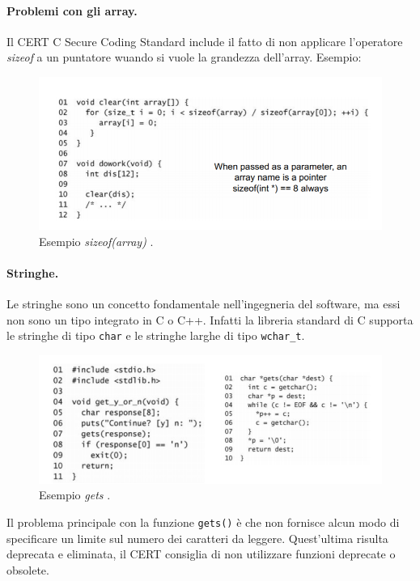 \paragraph{Problemi con gli array.}Il  CERT C Secure Coding Standard include il fatto di non applicare l'operatore \textit{sizeof} a un puntatore wuando si vuole la grandezza dell'array.
Esempio:
\begin{figure}[H]
	\centering
    \includegraphics[width=14cm, keepaspectratio]{santini/img/cap_2/sizeof_array.png}
	\caption{Esempio \textit{sizeof(array)} .}\label{fig:sizeof_array}
\end{figure}
\paragraph{Stringhe.} Le stringhe sono un concetto fondamentale nell'ingegneria del software, ma essi non sono un tipo integrato in C o C++. Infatti la libreria standard di C supporta le stringhe di tipo \verb|char| e le stringhe larghe di tipo \verb|wchar_t|.
\begin{figure}[H]
	\centering
    \includegraphics[width=14cm, keepaspectratio]{santini/img/cap_2/gets_1.png}
	\caption{Esempio \textit{gets} .}\label{fig:gets}
\end{figure}
Il problema principale con la funzione \verb|gets()| è che non fornisce alcun modo di specificare un limite sul numero dei caratteri da leggere. Quest'ultima risulta deprecata e eliminata, il CERT consiglia di non utilizzare funzioni deprecate o obsolete.

